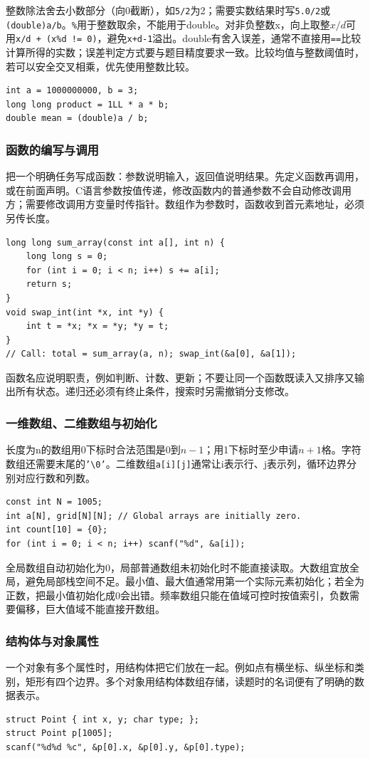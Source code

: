 整数除法舍去小数部分（向0截断），如\texttt{5/2}为2；需要实数结果时写\texttt{5.0/2}或\texttt{(double)a/b}。\texttt{\%}用于整数取余，不能用于double。对非负整数x，向上取整$x/d$可用\texttt{x/d + (x\%d != 0)}，避免\texttt{x+d-1}溢出。double有舍入误差，通常不直接用\texttt{==}比较计算所得的实数；误差判定方式要与题目精度要求一致。比较均值与整数阈值时，若可以安全交叉相乘，优先使用整数比较。
\begin{lstlisting}
int a = 1000000000, b = 3;
long long product = 1LL * a * b;
double mean = (double)a / b;
\end{lstlisting}
\subsubsection{函数的编写与调用}
把一个明确任务写成函数：参数说明输入，返回值说明结果。先定义函数再调用，或在前面声明。C语言参数按值传递，修改函数内的普通参数不会自动修改调用方；需要修改调用方变量时传指针。数组作为参数时，函数收到首元素地址，必须另传长度。
\begin{lstlisting}
long long sum_array(const int a[], int n) {
    long long s = 0;
    for (int i = 0; i < n; i++) s += a[i];
    return s;
}
void swap_int(int *x, int *y) {
    int t = *x; *x = *y; *y = t;
}
// Call: total = sum_array(a, n); swap_int(&a[0], &a[1]);
\end{lstlisting}
函数名应说明职责，例如判断、计数、更新；不要让同一个函数既读入又排序又输出所有状态。递归还必须有终止条件，搜索时另需撤销分支修改。
\subsubsection{一维数组、二维数组与初始化}
长度为n的数组用0下标时合法范围是$0$到$n-1$；用1下标时至少申请$n+1$格。字符数组还需要末尾的\texttt{'\textbackslash0'}。二维数组\texttt{a[i][j]}通常让i表示行、j表示列，循环边界分别对应行数和列数。
\begin{lstlisting}
const int N = 1005;
int a[N], grid[N][N]; // Global arrays are initially zero.
int count[10] = {0};
for (int i = 0; i < n; i++) scanf("%d", &a[i]);
\end{lstlisting}
全局数组自动初始化为0，局部普通数组未初始化时不能直接读取。大数组宜放全局，避免局部栈空间不足。最小值、最大值通常用第一个实际元素初始化；若全为正数，把最小值初始化成0会出错。频率数组只能在值域可控时按值索引，负数需要偏移，巨大值域不能直接开数组。
\subsubsection{结构体与对象属性}
一个对象有多个属性时，用结构体把它们放在一起。例如点有横坐标、纵坐标和类别，矩形有四个边界。多个对象用结构体数组存储，读题时的名词便有了明确的数据表示。
\begin{lstlisting}
struct Point { int x, y; char type; };
struct Point p[1005];
scanf("%d%d %c", &p[0].x, &p[0].y, &p[0].type);
\end{lstlisting}
